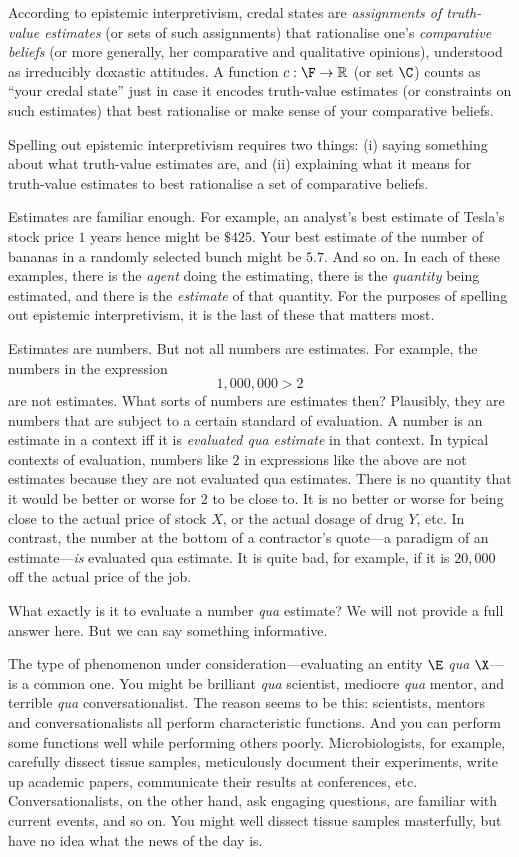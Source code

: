 According to epistemic interpretivism, credal states are \textit{assignments of truth-value estimates} (or sets of such assignments) that rationalise one's \textit{comparative beliefs} (or more generally, her comparative and qualitative opinions), understood as irreducibly doxastic attitudes. A function $c:\F\rightarrow\mathbb{R}$ (or set $\C$) counts as ``your credal state'' just in case it encodes truth-value estimates (or constraints on such estimates) that best rationalise or make sense of your comparative beliefs.

Spelling out epistemic interpretivism requires two things: (i) saying something about what truth-value estimates are, and (ii) explaining what it means for truth-value estimates to best rationalise a set of comparative beliefs.

Estimates are familiar enough. For example, an analyst's best estimate of Tesla's stock price $1$ years hence might be $\$425$. Your best estimate of the number of bananas in a randomly selected bunch might be $5.7$. And so on. In each of these examples, there is the \textit{agent} doing the estimating, there is the \textit{quantity} being estimated, and there is the \textit{estimate} of that quantity. For the purposes of spelling out epistemic interpretivism, it is the last of these that matters most.

Estimates are numbers. But not all numbers are estimates. For example, the numbers in the expression
\[
1,000,000>2
\]
are not estimates. What sorts of numbers are estimates then? Plausibly, they are numbers that are subject to a certain standard of evaluation. A number is an estimate in a context iff it is \textit{evaluated qua estimate} in that context. In typical contexts of evaluation, numbers like $2$ in expressions like the above are not estimates because they are not evaluated qua estimates. There is no quantity that it would be better or worse for $2$ to be close to. It is no better or worse for being close to the actual price of stock $X$, or the actual dosage of drug $Y$, etc. In contrast, the number at the bottom of a contractor's quote---a paradigm of an estimate---\textit{is} evaluated qua estimate. It is quite bad, for example, if it is \textsterling$20,000$ off the actual price of the job.

What exactly is it to evaluate a number \textit{qua} estimate? We will not provide a full answer here. But we can say something informative.

The type of phenomenon under consideration---evaluating an entity $\E$ \textit{qua} $\X$---is a common one. You might be brilliant \textit{qua} scientist, mediocre \textit{qua} mentor, and terrible \textit{qua} conversationalist. The reason seems to be this: scientists, mentors and conversationalists all perform characteristic functions. And you can perform some functions well while performing others poorly. Microbiologists, for example, carefully dissect tissue samples, meticulously document their experiments, write up academic papers, communicate their results at conferences, etc. Conversationalists, on the other hand, ask engaging questions, are familiar with current events, and so on. You might well dissect tissue samples masterfully, but have no idea what the news of the day is.

